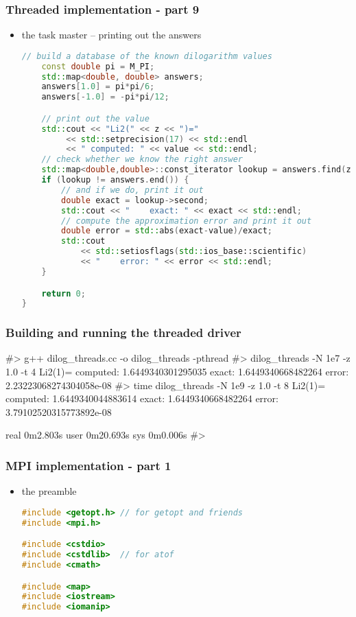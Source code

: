 \begin{frame}[fragile]
%
  \frametitle{Threaded implementation - part 9}
%
  \begin{itemize}
  \item the task master -- printing out the answers
  \begin{lstlisting}[language=c++,name=threaded]
    // build a database of the known dilogarithm values
    const double pi = M_PI;
    std::map<double, double> answers;
    answers[1.0] = pi*pi/6;
    answers[-1.0] = -pi*pi/12;

    // print out the value
    std::cout << "Li2(" << z << ")="
         << std::setprecision(17) << std::endl
         << " computed: " << value << std::endl;
    // check whether we know the right answer
    std::map<double,double>::const_iterator lookup = answers.find(z);
    if (lookup != answers.end()) {
        // and if we do, print it out
        double exact = lookup->second;
        std::cout << "    exact: " << exact << std::endl;
        // compute the approximation error and print it out
        double error = std::abs(exact-value)/exact;
        std::cout 
            << std::setiosflags(std::ios_base::scientific) 
            << "    error: " << error << std::endl;
    }

    return 0;
}
  \end{lstlisting}
%
  \end{itemize}
%
\end{frame}

\begin{frame}[fragile]
%
  \frametitle{Building and running the threaded driver}
%
  \begin{shell}{}
#> g++ dilog_threads.cc -o dilog_threads -pthread
#> dilog_threads -N 1e7 -z 1.0 -t 4
Li2(1)=
 computed: 1.6449340301295035
    exact: 1.6449340668482264
    error: 2.23223068274304058e-08
#> time dilog_threads -N 1e9 -z 1.0 -t 8
Li2(1)=
 computed: 1.6449340044883614
    exact: 1.6449340668482264
    error: 3.79102520315773892e-08

real    0m2.803s
user    0m20.693s
sys     0m0.006s
#>
  \end{shell}
%
\end{frame}

\begin{frame}[fragile]
%
  \frametitle{MPI implementation - part 1}
%
  \begin{itemize}
  \item the preamble
  \begin{lstlisting}[language=c++,name=mpi]
#include <getopt.h> // for getopt and friends
#include <mpi.h>

#include <cstdio>
#include <cstdlib>  // for atof
#include <cmath>

#include <map>
#include <iostream>
#include <iomanip>

  \end{lstlisting}
%
  \end{itemize}
%
\end{frame}

